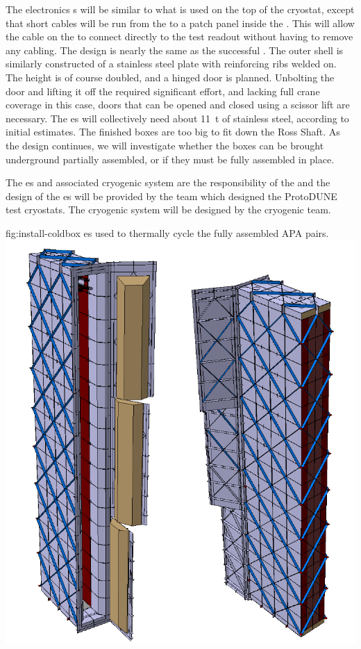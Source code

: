  
The \coldbox electronics \fdth{}s  will be  similar to what is used on the top of the  cryostat, except that short cables will be run from the   to a patch panel inside the \coldbox. This will allow the cable on the  to connect directly to the test readout without having to remove any cabling. The \coldbox  design is nearly the same as the successful  \coldbox. The outer shell is similarly constructed of a stainless steel plate with reinforcing ribs welded on. The height is of course doubled, and a hinged door is planned. Unbolting the door and lifting it off the  \coldbox required significant effort, and lacking full crane coverage in this case, doors that can be opened and closed using a scissor lift are necessary. The  \coldbox{}es will collectively need about \SI{11}{t} of stainless steel, according to initial estimates. The finished boxes are too big to fit down the Ross Shaft. As the design continues, 
we will investigate whether the boxes can be brought underground partially assembled, or if they must be fully assembled in place.  

The \coldbox{}es and associated cryogenic system are the responsibility of the  and the design of the \coldbox{}es will be provided by the  team which designed the ProtoDUNE test cryostats. The cryogenic system will be designed by the  cryogenic team. 

\begin{dunefigure}{fig:install-coldbox}
  {\coldbox{}es used to thermally cycle the fully assembled APA pairs. }
\includegraphics[width=.5\textwidth]{graphics/install-coldbox.pdf}
\end{dunefigure}




